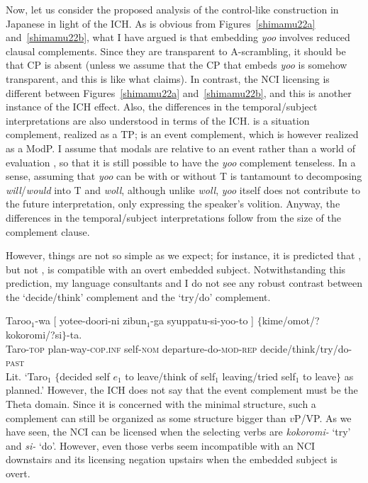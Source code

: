 \documentclass[output=paper]{langsci/langscibook}
\begin{document}
Now, let us consider the proposed analysis of the control-like construction in Japanese in light of the ICH. As is obvious from Figures~\ref{shimamu22a} and~\ref{shimamu22b}, what I have argued is that embedding \textit{yoo} involves reduced clausal complements. Since they are transparent to A-scrambling, it should be that CP is absent (unless we assume that the CP that embeds \textit{yoo} is somehow transparent, and this is like what \citealt{uchibori2000} claims). In contrast, the NCI licensing is different between Figures~\ref{shimamu22a} and~\ref{shimamu22b}, and this is another instance of the ICH effect. Also, the differences in the temporal/subject interpretations are also understood in terms of the ICH.  is a situation complement, realized as a TP;  is an event complement, which is however realized as a ModP. I assume that modals are relative to an event rather than a world of evaluation \citep{hacquard2006}, so that it is still possible to have the \textit{yoo} complement tenseless. In a sense, assuming that \textit{yoo} can be with or without T is tantamount to decomposing \textit{will}/\textit{would} into T and \textit{woll}, although unlike \textit{woll}, \textit{yoo} itself does not contribute to the future interpretation, only expressing the speaker's volition. Anyway, the differences in the temporal/subject interpretations follow from the size of the complement clause.

However, things are not so simple as we expect; for instance, it is predicted that , but not , is compatible with an overt embedded subject. Notwithstanding this prediction, my language consultants and I do not see any robust contrast between the `decide/think' complement and the `try/do' complement.

\ea\label{shimamu31} \gll Taroo$_1$-wa [  yotee-doori-ni zibun$_1$-ga syuppatu-si-yoo-to ] $\{$kime/omot/?kokoromi/?si$\}$-ta.\\
Taro-\textsc{top} {} plan-way-\textsc{cop.inf} self-\textsc{nom} departure-do-\textsc{mod-rep} {} \phantom{$\{$}decide/think/try/do-\textsc{past}\\
\glt Lit. `Taro$_1$ $\{$decided self $e_1$ to leave/think of self$_1$ leaving/tried self$_1$ to leave$\}$ as planned.'
\z
However, the ICH does not say that the event complement must be the Theta domain. Since it is concerned with the minimal structure, such a complement can still be organized as some structure bigger than $v$P/VP. As we have seen, the NCI can be licensed when the selecting verbs are \textit{kokoromi-} `try' and \textit{si-} `do'. However, even those verbs seem incompatible with an NCI downstairs and its licensing negation upstairs when the embedded subject is overt.
\end{document}
